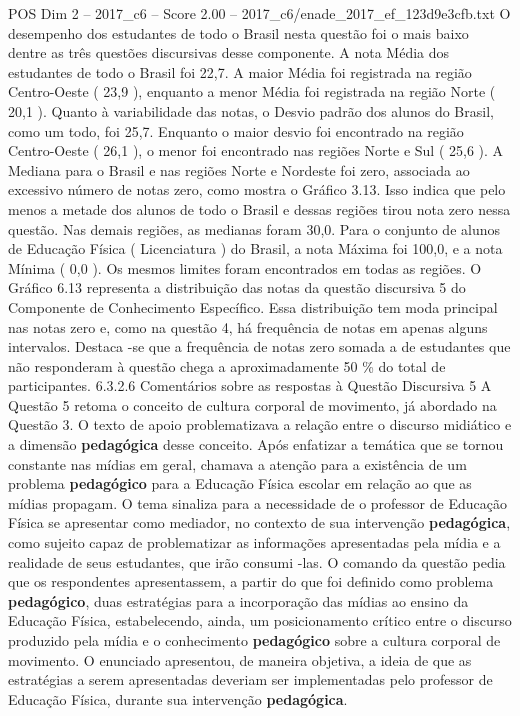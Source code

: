 \begin{textsample}{POS Dim 2 – 2017\_c6 – Score 2.00 – 2017\_c6/enade\_2017\_ef\_123d9e3cfb.txt}
O desempenho dos estudantes de todo o Brasil nesta questão foi o mais baixo dentre as três questões discursivas desse componente.
A nota Média dos estudantes de todo o Brasil foi 22,7.
A maior Média foi registrada na região Centro-Oeste ( 23,9 ), enquanto a menor Média foi registrada na região Norte ( 20,1 ).
Quanto à variabilidade das notas, o Desvio padrão dos alunos do Brasil, como um todo, foi 25,7.
Enquanto o maior desvio foi encontrado na região Centro-Oeste ( 26,1 ), o menor foi encontrado nas regiões Norte e Sul ( 25,6 ).
A Mediana para o Brasil e nas regiões Norte e Nordeste foi zero, associada ao excessivo número de notas zero, como mostra o Gráfico 3.13.
Isso indica que pelo menos a metade dos alunos de todo o Brasil e dessas regiões tirou nota zero nessa questão.
Nas demais regiões, as medianas foram 30,0.
Para o conjunto de alunos de Educação Física ( Licenciatura ) do Brasil, a nota Máxima foi 100,0, e a nota Mínima ( 0,0 ).
Os mesmos limites foram encontrados em todas as regiões.
O Gráfico 6.13 representa a distribuição das notas da questão discursiva 5 do Componente de Conhecimento Específico.
Essa distribuição tem moda principal nas notas zero e, como na questão 4, há frequência de notas em apenas alguns intervalos.
Destaca -se que a frequência de notas zero somada a de estudantes que não responderam à questão chega a aproximadamente 50 \% do total de participantes. 6.3.2.6 Comentários sobre as respostas à Questão Discursiva 5 A Questão 5 retoma o conceito de cultura corporal de movimento, já abordado na Questão 3.
O texto de apoio problematizava a relação entre o discurso midiático e a dimensão \textbf{pedagógica} desse conceito.
Após enfatizar a temática que se tornou constante nas mídias em geral, chamava a atenção para a existência de um problema \textbf{pedagógico} para a Educação Física escolar em relação ao que as mídias propagam.
O tema sinaliza para a necessidade de o professor de Educação Física se apresentar como mediador, no contexto de sua intervenção \textbf{pedagógica}, como sujeito capaz de problematizar as informações apresentadas pela mídia e a realidade de seus estudantes, que irão consumi -las.
O comando da questão pedia que os respondentes apresentassem, a partir do que foi definido como problema \textbf{pedagógico}, duas estratégias para a incorporação das mídias ao ensino da Educação Física, estabelecendo, ainda, um posicionamento crítico entre o discurso produzido pela mídia e o conhecimento \textbf{pedagógico} sobre a cultura corporal de movimento.
O enunciado apresentou, de maneira objetiva, a ideia de que as estratégias a serem apresentadas deveriam ser implementadas pelo professor de Educação Física, durante sua intervenção \textbf{pedagógica}.

\end{textsample}
